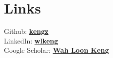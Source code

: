 \documentclass{deedy-resume-openfont}
\begin{document}
%
%
\lastupdated

%
%

%
%

\begin{minipage}[t]{0.33\textwidth}


\section{Links}
Github: \href{https://github.com/kengz}{\bf kengz} \\
LinkedIn:  \href{https://www.linkedin.com/in/wlkeng}{\bf wlkeng} \\
Google Scholar: \href{https://scholar.google.com/citations?user=J0aM_cEAAAAJ&hl=en}{\bf Wah Loon Keng}
\sectionsep




\end{minipage}
\end{document}
